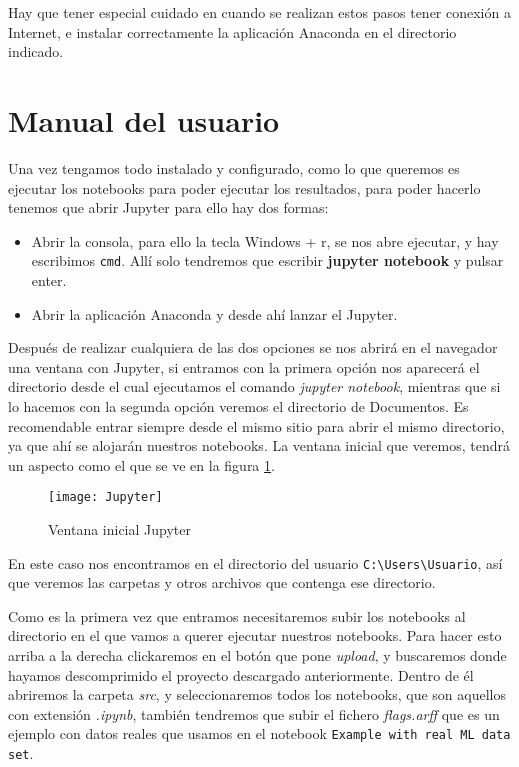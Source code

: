 Hay que tener especial cuidado en cuando se realizan estos pasos tener conexión a Internet, e instalar correctamente la aplicación Anaconda en el directorio indicado.
\section{Manual del usuario}
Una vez tengamos todo instalado y configurado, como lo que queremos es ejecutar los notebooks para poder ejecutar los resultados, para poder hacerlo tenemos que abrir Jupyter para ello hay dos formas:
\begin{itemize}
	\item Abrir la consola, para ello la tecla Windows + r, se nos abre ejecutar, y hay escribimos \texttt{cmd}. Allí solo tendremos que escribir \textbf{jupyter notebook} y pulsar enter.
	\item Abrir la aplicación Anaconda y desde ahí lanzar el Jupyter.
\end{itemize}
Después de realizar cualquiera de las dos opciones se nos abrirá en el navegador una ventana con Jupyter, si entramos con la primera opción nos aparecerá el directorio desde el cual ejecutamos el comando \textit{jupyter notebook}, mientras que si lo hacemos con la segunda opción veremos el directorio de Documentos. Es recomendable entrar siempre desde el mismo sitio para abrir el mismo directorio, ya que ahí se alojarán nuestros notebooks. La ventana inicial que veremos, tendrá un aspecto como el que se ve en la figura \ref{fig:Jupyter}.

\begin{figure}
\centering
\texttt{[image: Jupyter]}
\caption{Ventana inicial Jupyter}
\label{fig:Jupyter}
\end{figure}

En este caso nos encontramos en el directorio del usuario \texttt{C:\textbackslash Users\textbackslash Usuario}, así que veremos las carpetas y otros archivos que contenga ese directorio.

Como es la primera vez que entramos necesitaremos subir los notebooks al directorio en el que vamos a querer ejecutar nuestros notebooks. 
Para hacer esto arriba a la derecha clickaremos en el botón que pone \textit{upload}, y buscaremos donde hayamos descomprimido el proyecto descargado anteriormente. Dentro de él abriremos la carpeta \textit{src}, y seleccionaremos todos los notebooks, que son aquellos con extensión \textit{.ipynb}, también tendremos que subir el fichero \textit{flags.arff} que es un ejemplo con datos reales que usamos en el notebook \texttt{Example with real ML data set}.

